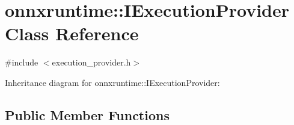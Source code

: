 \hypertarget{classonnxruntime_1_1IExecutionProvider}{}\section{onnxruntime\+:\+:I\+Execution\+Provider Class Reference}
\label{classonnxruntime_1_1IExecutionProvider}


{\ttfamily \#include $<$execution\+\_\+provider.\+h$>$}



Inheritance diagram for onnxruntime\+:\+:I\+Execution\+Provider\+:
\subsection*{Public Member Functions}
